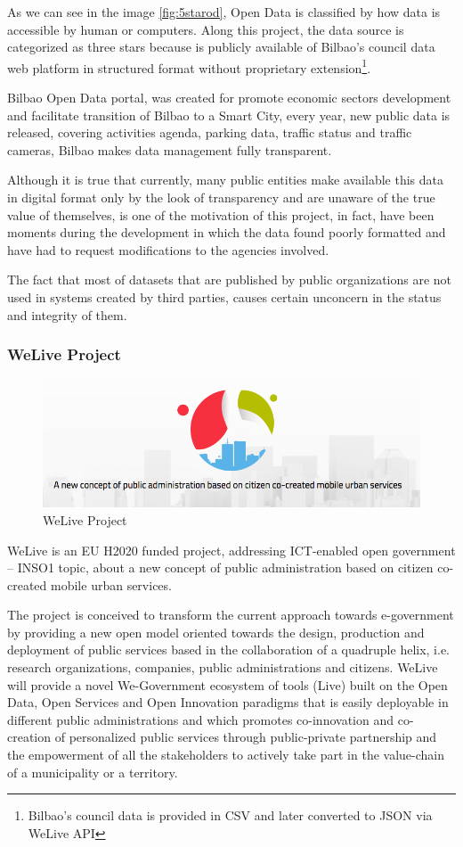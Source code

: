 \documentclass{DeustoFDP}
\begin{document}
As we can see in the image \ref{fig:5starod}, Open Data is classified by how data is accessible by human or computers. Along this project, the data source is categorized as three stars because is publicly available of Bilbao's council data web platform \cite{BilbaoOpenData} in structured format without proprietary extension\footnote{Bilbao's council data is provided in CSV and later converted to JSON via WeLive API}. 

Bilbao Open Data portal, was created for promote economic sectors development and facilitate transition of Bilbao to a Smart City, every year, new public data is released, covering activities agenda, parking data, traffic status and traffic cameras, Bilbao makes data management fully transparent.

Although it is true that currently, many public entities make available this data in digital format only by the look of transparency and are unaware of the true value of themselves, is one of the motivation of this project, in fact, have been moments during the development in which the data found poorly formatted and have had to request modifications to the agencies involved.

The fact that most of datasets that are published by public organizations are not used in systems created by third parties, causes certain unconcern in the status and integrity of them.

\subsubsection{WeLive Project}
\begin{figure}[h]
\centering
\includegraphics[width=0.7\linewidth]{fig/welive}
\caption[WeLive Project]{WeLive Project}
\label{fig:welive}
\end{figure}


WeLive is an EU H2020 funded project, addressing ICT-enabled open government – INSO1 topic, about a new concept of public administration based on citizen co-created mobile urban services.

The project is conceived to transform the current approach towards e-government by providing a new open model oriented towards the design, production and deployment of public services based in the collaboration of a quadruple helix, i.e. research organizations, companies, public administrations and citizens. WeLive will provide a novel We-Government ecosystem of tools (Live) built on the Open Data, Open Services and Open  Innovation paradigms that is easily deployable in different public administrations and which promotes co-innovation and co-creation of personalized public services through public-private partnership and the  empowerment of all the stakeholders to actively take part in the value-chain of a municipality or a territory. \cite{WeLive}
\end{document}
